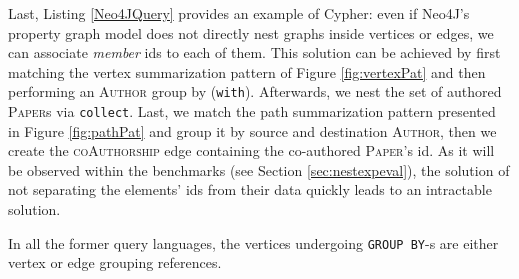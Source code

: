 Last, Listing \ref{Neo4JQuery} provides an example of Cypher: even if Neo4J's property graph model does not directly nest graphs inside vertices or edges, we can associate \textit{member} ids to each of them. This solution can be achieved by  first matching the vertex summarization pattern of Figure \ref{fig:vertexPat} and then performing an \textsc{Author} group by (\texttt{with}). Afterwards, we nest the set of authored \textsc{Paper}s via \texttt{collect}. Last, we match the path summarization pattern presented in Figure \ref{fig:pathPat} and group it by source and destination \textsc{Author}, then we create the \textsc{coAuthorship} edge containing the co-authored \textsc{Paper}'s id. As it will be observed within the benchmarks (see Section \ref{sec:nestexpeval}), the solution of not separating the elements' ids from their data quickly leads to an intractable solution.

In all the former query languages, the vertices undergoing  \texttt{GROUP BY}-s are either vertex or edge grouping references.
